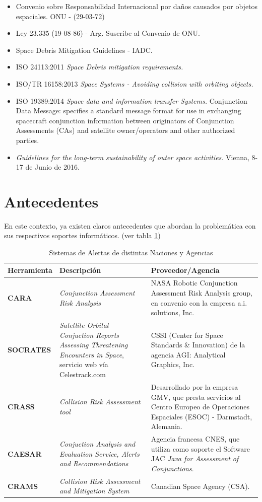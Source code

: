 \begin{itemize} 
\item Convenio sobre Responsabilidad Internacional por da\~nos causados por objetos espaciales. ONU - (29-03-72)
\item Ley 23.335 (19-08-86) - Arg. Suscribe al Convenio de ONU.
\item Space Debris Mitigation Guidelines - IADC.
\item ISO 24113:2011 {\it{Space Debris mitigation requirements.}}
\item ISO/TR 16158:2013 {\it{Space Systems - Avoiding collision with orbiting objects.}}
\item ISO 19389:2014 {\it{Space data and information transfer Systems.}} Conjunction Data Message: specifies a standard message format for use in exchanging spacecraft conjunction information between originators of Conjunction Assessments (CAs) and satellite owner/operators and other authorized parties.
\item {\it{Guidelines for the long-term sustainability of outer space activities}}. Vienna, 8-17 de Junio de 2016.
\end{itemize}

\section{Antecedentes}
En este contexto, ya existen claros antecedentes que abordan la problem\'atica con sus respectivos soportes inform\'aticos. (ver tabla \ref{tab:sisal})
\begin{table}[!h]
\centering
\begin{tabular}{|l|p{5cm}|p{6cm}|}
\hline
Herramienta & Descripci\'on & Proveedor/Agencia\\
\hline
{\bf{CARA}} & {\it{Conjunction Assessment Risk Analysis}} & NASA Robotic Conjunction Assessment Risk Analysis group, en convenio con la empresa a.i. solutions, Inc.\\
\hline
{\bf{SOCRATES}} & {\it{Satellite Orbital Conjuction Reports Assessing Threatening Encounters in Space}}, servicio web v\'ia Celestrack.com & CSSI (Center for Space Standards \& Innovation) de la agencia AGI: Analytical Graphics, Inc.\\
\hline
{\bf{CRASS}} & {\it{Collision Risk Assessment tool}} & Desarrollado por la
empresa GMV, que presta servicios al Centro Europeo de Operaciones
Espaciales (ESOC) - Darmstadt, Alemania. \cite{alarconRodriguez}\\
\hline
{\bf{CAESAR}} & {\it{Conjuction Analysis and Evaluation Service, Alerts and Recommendations}} & Agencia francesa CNES, que utiliza como soporte el Software JAC {\it{Java for Assessment of Conjunctions}}. \cite{laporte}\\
\hline
{\bf{CRAMS}} & {\it{Collision Risk Assessment and Mitigation System}} & Canadian Space Agency (CSA). \cite{babiker}\\
\hline
\end{tabular}
\caption[Sistemas de Alerta]{Sistemas de Alertas de distintas Naciones y Agencias}
\label{tab:sisal}
\end{table}

